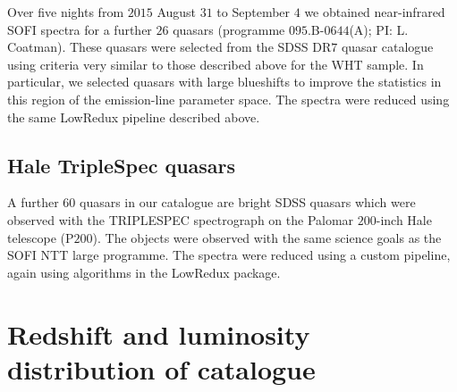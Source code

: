 Over five nights from $2015$ August $31$ to September $4$ we obtained near-infrared SOFI spectra for a further $26$ quasars (programme $095$.B-$0644$(A); PI: L. Coatman). 
These quasars were selected from the SDSS DR$7$ quasar catalogue using criteria very similar to those described above for the WHT sample. 
In particular, we selected quasars with large  blueshifts to improve the statistics in this region of the  emission-line parameter space. 
The spectra were reduced using the same LowRedux pipeline described above. 

\subsection{Hale TripleSpec quasars}

A further $60$ quasars in our catalogue are bright SDSS quasars which were observed with the TRIPLESPEC spectrograph \citep{herter08} on the Palomar $200$-inch Hale telescope (P$200$). 
The objects were observed with the same science goals as the SOFI NTT large programme. 
The spectra were reduced using a custom pipeline, again using algorithms in the LowRedux package. 

\section{Redshift and luminosity distribution of catalogue}

